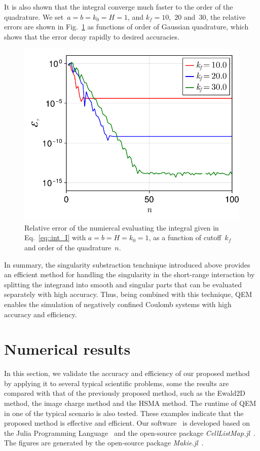 It is also shown that the integral converge much faster to the order of the quadrature.
We set~$a = b = k_0 = H = 1$, and $k_f = 10$,~$20$ and~$30$, the relative errors are shown in Fig.~\ref{fig:error} as functions of order of Gaussian quadrature, which shows that the error decay rapidly to desired accuracies.

\begin{figure}[htbp]
    \centering
    \includegraphics[width = 0.5\linewidth]{figs/int_convergence.pdf}
    \caption{Relative error of the numiercal evaluating the integral given in Eq.~\eqref{eq::int_I} with $a = b = H = k_0 = 1$, as a function of cutoff~$k_f$ and order of the quadrature~$n$.}
    \label{fig:error}
\end{figure}

In summary, the singularity substraction tenchnique introduced above provides an efficient method for handling the singularity in the short-range interaction by splitting the integrand into smooth and singular parts that can be evaluated separately with high accuracy.
Thus, being combined with this technique, QEM enables the simulation of negatively confined Coulomb systems with high accuracy and efficiency.

\section{Numerical results}
\label{sec:result}

In this section, we validate the accuracy and efficiency of our proposed method by applying it to several typical scientific problems, some the results are compared with that of the previously proposed method, such as the Ewald2D method, the image charge method and the HSMA method.
The runtime of QEM in one of the typical scenario is also tested.
These examples indicate that the proposed method is effective and efficient.
Our software~\cite{QuasiEwald} is developed based on the Julia Programming Language~\cite{Julia-2017} and the open-source package \emph{CellListMap.jl}~\cite{celllistmap}.
The figures are generated by the open-source package \emph{Makie.jl}~\cite{DanischKrumbiegel2021}.

